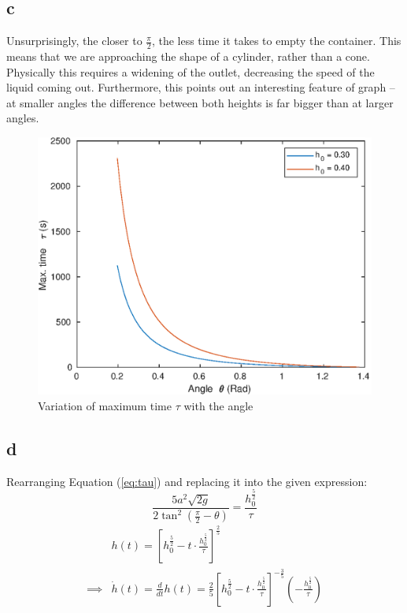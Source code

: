 \subsection{c}

Unsurprisingly, the closer to $\frac{\pi}{2}$, the less time it takes to empty the container.
This means that we are approaching the shape of a cylinder, rather than a cone.
Physically this requires a widening of the outlet, decreasing the speed of the liquid coming out.
Furthermore, this points out an interesting feature of graph -- at smaller angles the difference between both heights is far bigger than at larger angles.   

\pagebreak

\begin{figure}[]
	\includegraphics[scale=0.65, center]{./eps/topic5_c.eps}
	\caption{Variation of maximum time $\tau$ with the angle}
	\label{fig:Topic5-c}
\end{figure}



\subsection{d}
Rearranging Equation (\ref{eq:tau}) and replacing it into the given expression:
\begin{equation*}
    \frac{ 5a^2 \sqrt{2g} }{ 2\tan^2\left(\frac{\pi}{2} - \theta\right)} = \frac{h_0^{\frac{5}{2}}}{\tau}
\end{equation*}
\begin{equation}
\begin{align}
    &h(t) = {\left[
        h_0^{\frac{5}{2}} - t \cdot \frac{
            h_0^{ \frac{5}{2} }
            }{\tau}    
            \right]}^\frac{2}{5} \\
    \implies &\dot{h}(t) = \frac{d}{dt}h(t) =\frac{2}{5} {\left[
        h_0^{\frac{5}{2}} - t \cdot \frac{
            h_0^{ \frac{5}{2} }
            }{\tau}    
        \right]}^{-\frac{3}{5}}
    \left(
        -\frac{ h_0^{ \frac{5}{2} }}{\tau}    
    \right)
\end{align}
\end{equation}

